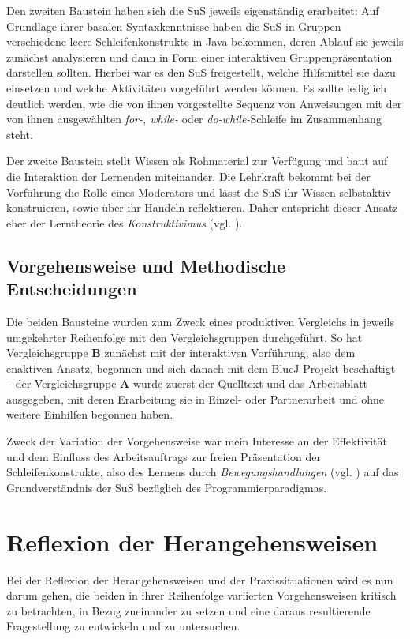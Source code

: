 \documentclass[paper=a4, DIV=13, BCOR=12mm, twoside=on, onecolumn=on, open = any, titlepage =on, parskip =half-, headsepline = on, footsepline = on, chapterprefix = on, sectionprefix = on, appendixprefix = off, fontsize = 12pt, numbers = noenddot, abstract = off]{scrreprt}
\begin{document}
Den zweiten Baustein haben sich die SuS jeweils eigenständig erarbeitet: Auf Grundlage ihrer basalen Syntaxkenntnisse haben die SuS in Gruppen verschiedene leere Schleifenkonstrukte in Java bekommen, deren Ablauf sie jeweils zunächst analysieren und dann in Form einer interaktiven Gruppenpräsentation darstellen sollten. Hierbei war es den SuS freigestellt, welche Hilfsmittel sie dazu einsetzen und welche Aktivitäten vorgeführt werden können. Es sollte lediglich deutlich werden, wie die von ihnen vorgestellte Sequenz von Anweisungen mit der von ihnen ausgewählten \emph{for-, while-} oder \emph{do-while-}Schleife im Zusammenhang steht.

Der zweite Baustein stellt Wissen als Rohmaterial zur Verfügung und baut auf die Interaktion der Lernenden miteinander. Die Lehrkraft bekommt bei der Vorführung die Rolle eines Moderators und lässt die SuS ihr Wissen selbstaktiv konstruieren, sowie über ihr Handeln reflektieren. Daher entspricht dieser Ansatz eher der Lerntheorie des \emph{Konstruktivimus} (vgl. \cite[S.219]{schwarzer:07}).

\par \singlespacing
 \section{Vorgehensweise und Methodische Entscheidungen}
 \label{sec:vorgehensweisen}
\onehalfspacing
\enlargethispage{2ex}
Die beiden Bausteine wurden zum Zweck eines produktiven Vergleichs in jeweils umgekehrter Reihenfolge mit den Vergleichsgruppen durchgeführt. So hat Vergleichsgruppe \textsc{\textbf{B}} zunächst mit der interaktiven Vorführung, also dem enaktiven Ansatz, begonnen und sich danach mit dem BlueJ-Projekt beschäftigt -- der Vergleichsgruppe \textsc{\textbf{A}} wurde zuerst der Quelltext und das Arbeitsblatt ausgegeben, mit deren Erarbeitung sie in Einzel- oder Partnerarbeit und ohne weitere Einhilfen begonnen haben. 

Zweck der Variation der Vorgehensweise war mein Interesse an der Effektivität und dem Einfluss des Arbeitsauftrags zur freien Präsentation der Schleifenkonstrukte, also des Lernens durch \emph{Bewegungshandlungen} (vgl. \cite[S.183f.]{aebli:11}) auf das Grundverständnis der SuS bezüglich des Programmierparadigmas.



\par \singlespacing
\chapter{Reflexion der Herangehensweisen}
\onehalfspacing
\vspace*{-1cm}
 Bei der Reflexion der Herangehensweisen und der Praxissituationen wird es nun darum gehen, die beiden in ihrer Reihenfolge variierten Vorgehensweisen kritisch zu betrachten, in Bezug zueinander zu setzen und eine daraus resultierende Fragestellung zu entwickeln und zu untersuchen.
\end{document}
